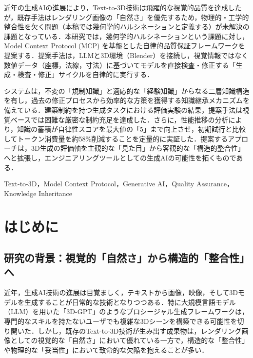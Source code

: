 \documentclass[dvipdfmx, a4paper, 9pt]{deimj}
\begin{document}
\pagestyle{empty}

\begin{jabstract}
近年の生成AIの進展により，Text-to-3D技術は飛躍的な視覚的品質を達成したが，既存手法はレンダリング画像の「自然さ」を優先するため，物理的・工学的整合性を欠く問題（本稿では幾何学的ハルシネーションと定義する）が未解決の課題となっている．本研究では，幾何学的ハルシネーションという課題に対し，Model Context Protocol (MCP) を基盤とした自律的品質保証フレームワークを提案する．提案手法は，LLMと3D環境（Blender）を接続し，視覚情報ではなく数値データ（座標，法線，寸法）に基づいてモデルを直接検査・修正する「生成・検査・修正」サイクルを自律的に実行する．

システムは，不変の「規制知識」と適応的な「経験知識」からなる二層知識構造を有し，過去の修正プロセスから効率的な方策を獲得する知識継承メカニズムを備えている．建築制約を持つ生成タスクにおける評価実験の結果，提案手法は視覚ベースでは困難な厳密な制約充足を達成した．さらに，性能推移の分析により，知識の蓄積が自律性スコアを最大値の「5」まで向上させ，初期試行と比較してトークン消費量を約58\%削減することを定量的に実証した．提案するアプローチは，3D生成の評価軸を主観的な「見た目」から客観的な「構造的整合性」へと拡張し，エンジニアリングツールとしての生成AIの可能性を拓くものである．
\end{jabstract}

\begin{jkeyword}
Text-to-3D，Model Context Protocol，Generative AI，Quality Assurance，Knowledge Inheritance
\end{jkeyword}

\maketitle

\section{はじめに}

\subsection{研究の背景：視覚的「自然さ」から構造的「整合性」へ}

近年，生成AI技術の進展は目覚ましく，テキストから画像，映像，そして3Dモデルを生成することが日常的な技術となりつつある．特に大規模言語モデル（LLM）を用いた「3D-GPT」\cite{sun20233dgpt}のようなプロシージャル生成フレームワークは，専門的なスキルを持たないユーザでも複雑な3Dシーンを構築できる可能性を切り開いた．しかし，既存のText-to-3D技術が生み出す成果物は，レンダリング画像としての視覚的な「自然さ」において優れている一方で，構造的な「整合性」や物理的な「妥当性」において致命的な欠陥を抱えることが多い．
\end{document}
